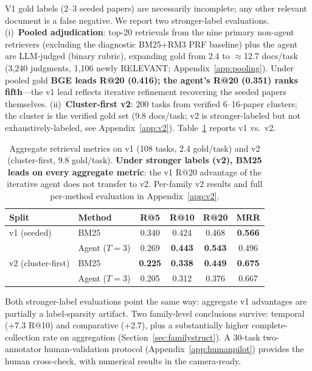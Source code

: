 \documentclass{article}
\begin{document}
V1 gold labels (2--3 seeded papers) are necessarily incomplete; any other relevant document is a false negative. We report two stronger-label evaluations. (i)~\textbf{Pooled adjudication}: top-20 retrievals from the nine primary non-agent retrievers (excluding the diagnostic BM25+RM3 PRF baseline) plus the agent are LLM-judged (binary rubric), expanding gold from 2.4 to $\approx$12.7 docs/task (3{,}240 judgments, 1{,}106 newly RELEVANT; Appendix~\ref{app:pooling}). Under pooled gold \textbf{BGE leads R@20 (0.416); the agent's R@20 (0.351) ranks fifth}---the v1 lead reflects iterative refinement recovering the seeded papers themselves. (ii)~\textbf{Cluster-first v2}: 200 tasks from verified 6--16-paper clusters; the cluster is the verified gold set (9.8 docs/task; v2 is stronger-labeled but not exhaustively-labeled, see Appendix~\ref{app:v2}). Table~\ref{tab:v2main} reports v1 vs.\ v2.

\begin{table}[t]
\centering
\caption{Aggregate retrieval metrics on v1 (108 tasks, 2.4 gold/task) and v2 (cluster-first, 9.8 gold/task). \textbf{Under stronger labels (v2), BM25 leads on every aggregate metric}: the v1 R@20 advantage of the iterative agent does not transfer to v2. Per-family v2 results and full per-method evaluation in Appendix~\ref{app:v2}.}
\label{tab:v2main}
\small
\begin{tabular}{llcccc}
\toprule
\textbf{Split} & \textbf{Method} & \textbf{R@5} & \textbf{R@10} & \textbf{R@20} & \textbf{MRR} \\
\midrule
v1 (seeded)        & BM25            & 0.340 & 0.424 & 0.468 & \textbf{0.566} \\
                   & Agent ($T{=}3$) & 0.269 & \textbf{0.443} & \textbf{0.543} & 0.496 \\
v2 (cluster-first) & BM25            & \textbf{0.225} & \textbf{0.338} & \textbf{0.449} & \textbf{0.675} \\
                   & Agent ($T{=}3$) & 0.205 & 0.312 & 0.376 & 0.667 \\
\bottomrule
\end{tabular}
\end{table}

Both stronger-label evaluations point the same way: aggregate v1 advantages are partially a label-sparsity artifact. Two family-level conclusions survive: temporal (+7.3 R@10) and comparative (+2.7), plus a substantially higher complete-collection rate on aggregation (Section~\ref{sec:familystruct}). A 30-task two-annotator human-validation protocol (Appendix~\ref{app:humanpilot}) provides the human cross-check, with numerical results in the camera-ready.
\end{document}
